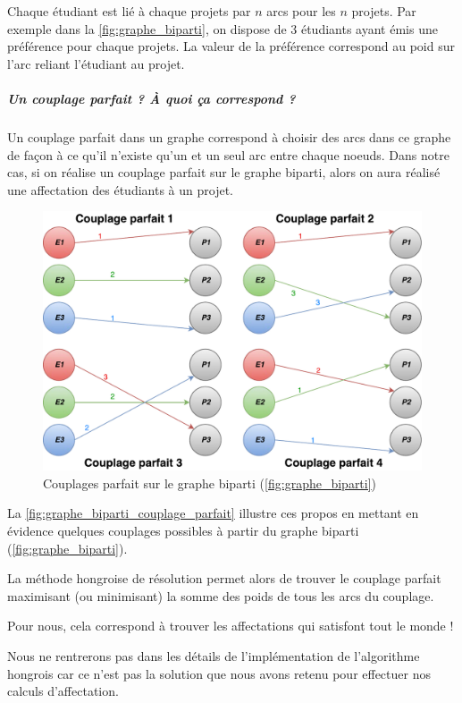 \documentclass[final,poster]{polytech/polytech}
\begin{document}
Chaque étudiant est lié à chaque projets par $n$ arcs pour les $n$ projets. Par exemple dans la \autoref{fig:graphe_biparti}, on dispose de 3 étudiants ayant émis une préférence pour chaque projets. La valeur de la préférence correspond au poid sur l'arc reliant l'étudiant au projet.

\subparagraph{Un couplage parfait ? \`A quoi ça correspond ?}

Un couplage parfait dans un graphe correspond à choisir des arcs dans ce graphe de façon à ce qu'il n'existe qu'un et un seul arc entre chaque noeuds.
Dans notre cas, si on réalise un couplage parfait sur le graphe biparti, alors on aura réalisé une affectation des étudiants à un projet. 

\begin{figure}[htbp]
\includegraphics[width=12cm]{images/graphe_biparti_couplage_parfait}
\caption{\label{fig:graphe_biparti_couplage_parfait}Couplages parfait sur le graphe biparti (\autoref{fig:graphe_biparti})}
\end{figure}

La \autoref{fig:graphe_biparti_couplage_parfait} illustre ces propos en mettant en évidence quelques couplages possibles à partir du graphe biparti (\autoref{fig:graphe_biparti}).

La méthode hongroise de résolution permet alors de trouver le couplage parfait maximisant (ou minimisant) la somme des poids de tous les arcs du couplage.

Pour nous, cela correspond à trouver les affectations qui satisfont tout le monde ! 

Nous ne rentrerons pas dans les détails de l'implémentation de l'algorithme hongrois car ce n'est pas la solution que nous avons retenu pour effectuer nos calculs d'affectation. 
\end{document}
